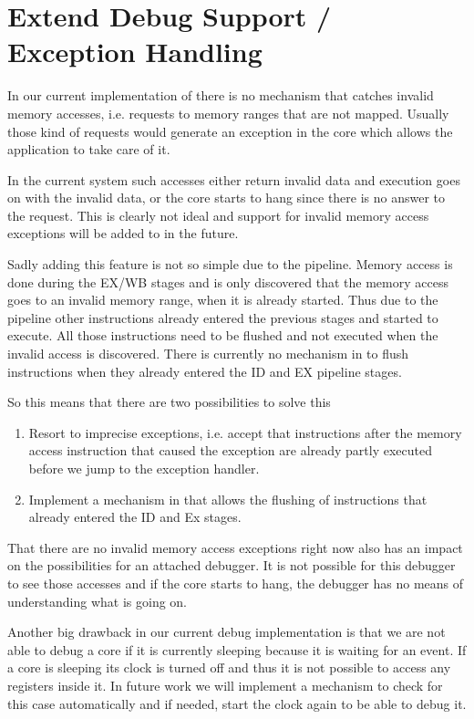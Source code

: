 \section{Extend Debug Support / Exception Handling}

In our current implementation of \orion there is no mechanism that catches
invalid memory accesses, i.e. requests to memory ranges that are not mapped.
Usually those kind of requests would generate an exception in the core
which allows the application to take care of it.

In the current system such accesses either return invalid data and execution
goes on with the invalid data, or the core starts to hang since there is no
answer to the request.
This is clearly not ideal and support for invalid memory access exceptions will
be added to \orion in the future.

Sadly adding this feature is not so simple due to the pipeline. Memory
access is done during the EX/WB stages and is only discovered that the memory
access goes to an invalid memory range, when it is already started. Thus due to
the pipeline other instructions already entered the previous stages and started
to execute. All those instructions need to be flushed and not executed when the
invalid access is discovered. There is currently no mechanism in \orion to flush
instructions when they already entered the ID and EX pipeline stages.

So this means that there are two possibilities to solve this
\begin{enumerate}
  \item Resort to imprecise exceptions, i.e. accept that instructions after the
  memory access instruction that caused the exception are already partly
  executed before we jump to the exception handler.
  \item Implement a mechanism in \orion that allows the flushing of instructions
  that already entered the ID and Ex stages.
\end{enumerate}


That there are no invalid memory access exceptions right now also has an impact
on the possibilities for an attached debugger. It is not possible for this
debugger to see those accesses and if the core starts to hang, the debugger has
no means of understanding what is going on.


Another big drawback in our current debug implementation is that we are not able
to debug a core if it is currently sleeping because it is waiting for an event.
If a core is sleeping its clock is turned off and thus it is not possible to
access any registers inside it.
In future work we will implement a mechanism to check for this case
automatically and if needed, start the clock again to be able to debug it.
